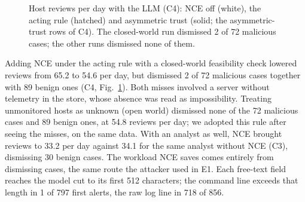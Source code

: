 \documentclass[conference]{IEEEtran}
\begin{document}
\begin{figure}[t]
\centering
{}
\caption{Host reviews per day with the LLM (C4): NCE off (white), the acting rule (hatched) and asymmetric trust
(solid; the asymmetric-trust rows of C4). The closed-world run dismissed 2 of 72 malicious cases; the other runs
dismissed none of them.}
\label{fig:c4}
\end{figure}

Adding NCE under the acting rule with a closed-world feasibility check lowered reviews from 65.2 to 54.6 per day,
but dismissed 2 of 72 malicious cases together with 89 benign ones (C4, Fig.~\ref{fig:c4}). Both misses involved a server without
telemetry in the store, whose absence was read as impossibility. Treating unmonitored hosts as unknown (open world)
dismissed none of the 72 malicious cases and 89 benign ones, at 54.8 reviews per day; we adopted this rule after
seeing the misses, on the same data. With an analyst as well, NCE brought reviews to 33.2 per day against 34.1 for
the same analyst without NCE (C3), dismissing 30 benign cases. The workload NCE saves comes entirely from dismissing
cases, the same route the attacker used in E1. Each free-text field reaches the model cut to its first 512
characters; the command line exceeds that length in 1 of 797 first alerts, the raw log line in 718 of 856.
\end{document}
